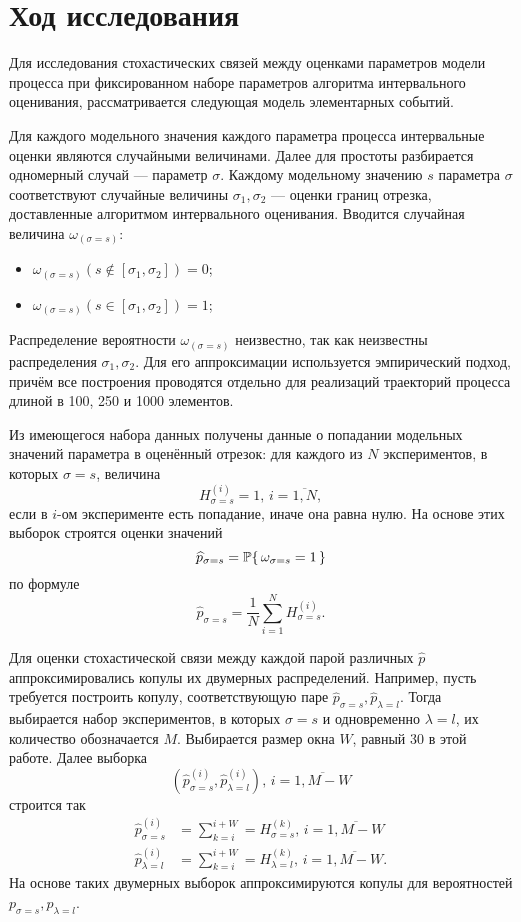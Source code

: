 \chapter{Ход исследования}	%

Для исследования стохастических связей между оценками параметров модели процесса при фиксированном наборе параметров алгоритма интервального оценивания, рассматривается следующая модель элементарных событий.

Для каждого модельного значения каждого параметра процесса интервальные оценки являются случайными величинами. Далее для простоты разбирается одномерный случай --- параметр $\sigma$. Каждому модельному значению $s$ параметра $\sigma$ соответствуют случайные величины $\sigma_1, \sigma_2$ --- оценки границ отрезка, доставленные алгоритмом интервального оценивания. Вводится случайная величина $\omega_{(\sigma = s)}$:
  \begin{itemize}
    \item $\omega_{(\sigma = s)}(s \notin [\sigma_1, \sigma_2]) = 0$;
    \item $\omega_{(\sigma = s)}(s \in [\sigma_1, \sigma_2]) = 1$;
  \end{itemize}

Распределение вероятности $\omega_{(\sigma = s)}$ неизвестно, так как неизвестны распределения $\sigma_1, \sigma_2$. Для его аппроксимации используется эмпирический подход, причём все построения проводятся отдельно для реализаций траекторий процесса длиной в 100, 250 и 1000 элементов.

Из имеющегося набора данных получены данные о попадании модельных значений параметра в оценённый отрезок: для каждого из $N$ экспериментов, в которых $\sigma = s$, величина
\[
H_{\sigma = s}^{(i)} = 1,\, i=\overline{1, N},
\]
если в $i$-ом эксперименте есть попадание, иначе она равна нулю. На основе этих выборок строятся оценки значений
\[
\widehat{p}_{\sigma = s} = \P\{\, \omega_{\sigma = s} = 1\,\}
\]
по формуле
\[
\widehat{p}_{\sigma = s} = \frac{1}{N} \sum_{i=1}^N H_{\sigma = s}^{(i)}.
\]

Для оценки стохастической связи между каждой парой различных $\widehat{p}$ аппроксимировались копулы их двумерных распределений. Например, пусть требуется построить копулу, соответствующую паре $\widehat{p}_{\sigma = s}, \widehat{p}_{\lambda = l}$. Тогда выбирается набор экспериментов, в которых $\sigma = s$ и одновременно $\lambda = l$, их количество обозначается $M$. Выбирается размер окна $W$, равный 30 в этой работе. Далее выборка
\[
(\widehat{p}_{\sigma = s}^{(i)}, \widehat{p}_{\lambda = l}^{(i)}),\, i = \overline{1, M - W}
\]
строится так
\begin{align}
	\widehat{p}_{\sigma = s}^{(i)}  &= \sum_{k=i}^{i + W} = H_{\sigma = s}^{(k)},\, i = \overline{1, M - W} \\
	\widehat{p}_{\lambda = l}^{(i)} &= \sum_{k=i}^{i + W} = H_{\lambda = l}^{(k)},\, i = \overline{1, M - W}.
\end{align}
На основе таких двумерных выборок аппроксимируются копулы для вероятностей $p_{\sigma = s},  p_{\lambda = l}$.

